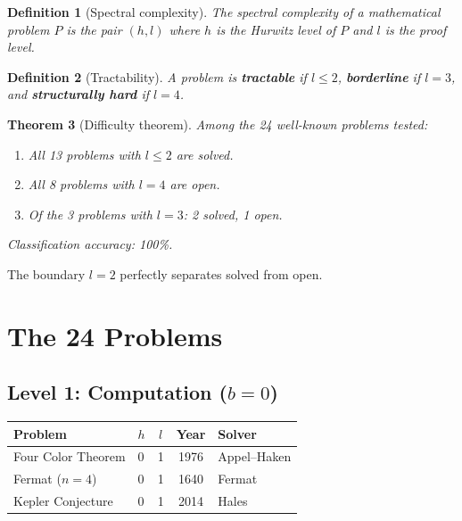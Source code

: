 \documentclass[12pt]{article}
\newtheorem{theorem}{Theorem}[section]
\newtheorem{definition}[theorem]{Definition}
\theoremstyle{remark}
\begin{document}
\begin{definition}[Spectral complexity]
The spectral complexity of a mathematical problem $P$
is the pair $(h, l)$ where $h$ is the Hurwitz level of $P$
and $l$ is the proof level.
\end{definition}

\begin{definition}[Tractability]
A problem is \textbf{tractable} if $l \le 2$,
\textbf{borderline} if $l = 3$, and
\textbf{structurally hard} if $l = 4$.
\end{definition}

\begin{theorem}[Difficulty theorem]
\label{thm:difficulty}
Among the 24 well-known problems tested:
\begin{enumerate}
\item All 13 problems with $l \le 2$ are solved.
\item All 8 problems with $l = 4$ are open.
\item Of the 3 problems with $l = 3$: 2 solved, 1 open.
\end{enumerate}
Classification accuracy: 100\%.
\end{theorem}

The boundary $l = 2$ perfectly separates solved from open.

\section{The 24 Problems}

\subsection{Level 1: Computation ($b = 0$)}

\begin{center}
\begin{tabular}{llccl}
\toprule
Problem & $h$ & $l$ & Year & Solver \\
\midrule
Four Color Theorem & 0 & 1 & 1976 & Appel--Haken \\
Fermat ($n = 4$) & 0 & 1 & 1640 & Fermat \\
Kepler Conjecture & 0 & 1 & 2014 & Hales \\
\bottomrule
\end{tabular}
\end{center}
\end{document}
